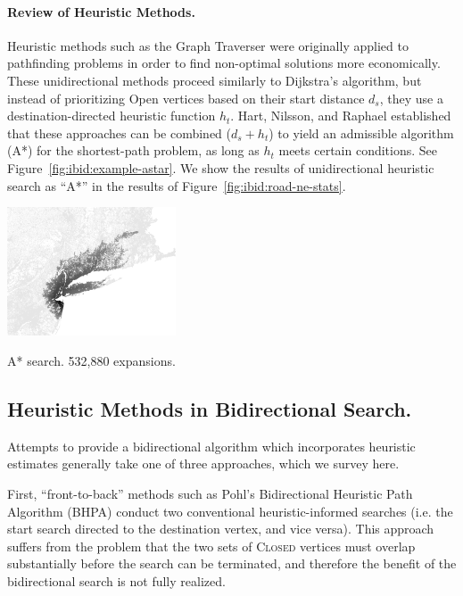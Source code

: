 \paragraph{Review of Heuristic Methods.}
Heuristic methods such as the Graph Traverser
\citep{doran1966graphtraverser} were originally
applied to pathfinding problems in order to find non-optimal
solutions more economically.
These unidirectional methods proceed similarly to Dijkstra's algorithm,
but instead of prioritizing {\sc Open} vertices
based on their start distance $d_s$,
they use a destination-directed heuristic function $h_t$.
Hart, Nilsson, and Raphael \citep{hart1968astar} established that
these approaches can be combined ($d_s + h_t$) to yield
an admissible algorithm (A*) for the shortest-path problem,
as long as $h_t$ meets certain conditions.
See Figure~\ref{fig:ibid:example-astar}.
We show the results of unidirectional heuristic search as ``A*''
in the results of Figure~\ref{fig:ibid:road-ne-stats}.

\begin{marginfigure}%
   \centering%
   \includegraphics[width=5cm]{figs/incbi-road-ne/singleshot/example-astar.png}%
   \caption{A* search.
      532,880 expansions.}%
   \label{fig:ibid:example-astar}%
\end{marginfigure}

\subsection{Heuristic Methods in Bidirectional Search.}
\label{subsec:ibid:heuristic-bidirectional}

Attempts to provide a bidirectional algorithm which incorporates
heuristic estimates generally take one of three approaches,
which we survey here.

First,
``front-to-back'' methods
such as Pohl's Bidirectional Heuristic Path Algorithm (BHPA)
\citep{pohl1971bidirectional}
conduct two conventional heuristic-informed searches
(i.e. the start search directed to the destination vertex,
and vice versa).
This approach suffers from the problem that the two sets of
\textsc{Closed} vertices must overlap substantially
before the search can be terminated,
and therefore the benefit of the bidirectional search
is not fully realized.

